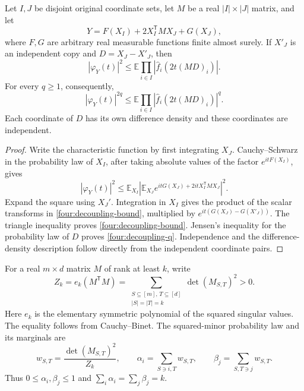 \begin{lemma}\label{four:decoupling}
Let \(I,J\) be disjoint original coordinate sets, let \(M\) be a real
\(|I|\times|J|\) matrix, and let
\[
 Y=F(X_I)+2X_I^{\mathsf T}MX_J+G(X_J),
\]
where \(F,G\) are arbitrary real measurable functions finite almost
surely.  If \(X'_J\) is an independent copy and \(D=X_J-X'_J\), then
\begin{equation}\label{four:decoupling-bound}
 |\varphi_Y(t)|^2
 \leq\mathbb E\prod_{i\in I}
      |\widehat f_i(2t(MD)_i)|.
\end{equation}
For every \(q\geq1\), consequently,
\begin{equation}\label{four:decoupling-q}
 |\varphi_Y(t)|^{2q}
 \leq\mathbb E\prod_{i\in I}
      |\widehat f_i(2t(MD)_i)|^q .
\end{equation}
Each coordinate of \(D\) has its own difference density and these
coordinates are independent.
\end{lemma}
\begin{proof}
Write the characteristic function by first integrating \(X_J\).
Cauchy--Schwarz in the probability law of \(X_I\), after taking
absolute values of the factor \(e^{itF(X_I)}\), gives
\[
 |\varphi_Y(t)|^2
 \leq\mathbb E_{X_I}
 \left|\mathbb E_{X_J}
   e^{itG(X_J)+2itX_I^{\mathsf T}MX_J}\right|^2.
\]
Expand the square using \(X_J'\).  Integration in \(X_I\) gives the
product of the scalar transforms in \eqref{four:decoupling-bound},
multiplied by \(e^{it(G(X_J)-G(X'_J))}\).
The triangle inequality proves \eqref{four:decoupling-bound}.
Jensen's inequality for the probability law of \(D\) proves
\eqref{four:decoupling-q}.  Independence and the difference-density
description follow directly from the independent coordinate pairs.
\end{proof}

For a real \(m\times d\) matrix \(M\) of rank at least \(k\), write
\begin{equation}\label{four:volume-definition}
 Z_k=e_k(M^{\mathsf T}M)
 =\sum_{\substack{S\subseteq[m],\,T\subseteq[d]\\|S|=|T|=k}}
           \det(M_{S,T})^2>0.
\end{equation}
Here \(e_k\) is the elementary symmetric polynomial of the squared
singular values.  The equality follows from Cauchy--Binet.
The squared-minor probability law and its marginals are
\begin{equation}\label{four:volume-marginals}
 w_{S,T}=\frac{\det(M_{S,T})^2}{Z_k},\qquad
 \alpha_i=\sum_{S\ni i,T}w_{S,T},\qquad
 \beta_j=\sum_{S,T\ni j}w_{S,T}.
\end{equation}
Thus \(0\leq\alpha_i,\beta_j\leq1\) and
\(\sum_i\alpha_i=\sum_j\beta_j=k\).

